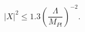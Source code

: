\begin{equation}\label{eq:limit}
|X|^2\leq 1.3
\left(\frac{\Lambda}{M_{Pl}}\right)^{-2}.
\end{equation}

